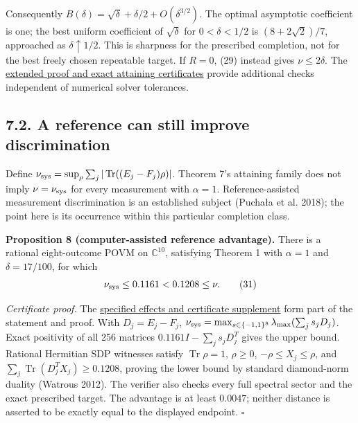 \documentclass[
  11pt,
  a4paper,
]{article}
\begin{document}
Consequently \(B(\delta)=\sqrt\delta+\delta/2+O(\delta^{3/2})\). The
optimal asymptotic coefficient is one; the best uniform coefficient of
\(\sqrt\delta\) for \(0<\delta<1/2\) is \((8+2\sqrt2)/7\), approached as
\(\delta\uparrow1/2\). This is sharpness for the prescribed completion,
not for the best freely chosen repeatable target. If \(R=0\), (29)
instead gives \(\nu\le2\delta\). The
\href{https://github.com/christophergardner-star/RC-Discovery/blob/327986e318cbfeb8632f61dbd9bad2f0dc18b3c3/theory/perfect_packing_sharpness.md}{extended
proof and exact attaining certificates} provide additional checks
independent of numerical solver tolerances.

\subsection{7.2. A reference can still improve
discrimination}\label{a-reference-can-still-improve-discrimination}

Define
\(\nu_{\rm sys}=\sup_\rho\sum_j|\operatorname{Tr}((E_j-F_j)\rho)|\).
Theorem 7's attaining family does not imply \(\nu=\nu_{\rm sys}\) for
every measurement with \(\alpha=1\). Reference-assisted measurement
discrimination is an established subject (Puchała et al. 2018); the
point here is its occurrence within this particular completion class.

\textbf{Proposition 8 (computer-assisted reference advantage).} There is
a rational eight-outcome POVM on \(\mathbb C^{10}\), satisfying Theorem
1 with \(\alpha=1\) and \(\delta=17/100\), for which
\[\nu_{\rm sys}\le0.1161<0.1208\le\nu.
\tag{31}\]

\emph{Certificate proof.} The
\href{https://github.com/christophergardner-star/RC-Discovery/blob/56f50f49db301a0f69eaed8ab5a650591a6a9aae/theory/reference_advantage.md}{specified
effects and certificate supplement} form part of the statement and
proof. With \(D_j=E_j-F_j\),
\(\nu_{\rm sys}=\max_{s\in\{-1,1\}^8}\lambda_{\max}(\sum_js_jD_j)\).
Exact positivity of all 256 matrices \(0.1161I-\sum_js_jD_j^T\) gives
the upper bound. Rational Hermitian SDP witnesses satisfy
\(\operatorname{Tr}\rho=1\), \(\rho\ge0\), \(-\rho\le X_j\le\rho\), and
\(\sum_j\operatorname{Tr}(D_j^TX_j)\ge0.1208\), proving the lower bound
by standard diamond-norm duality (Watrous 2012). The verifier also
checks every full spectral sector and the exact prescribed target. The
advantage is at least \(0.0047\); neither distance is asserted to be
exactly equal to the displayed endpoint. \(\square\)
\end{document}
